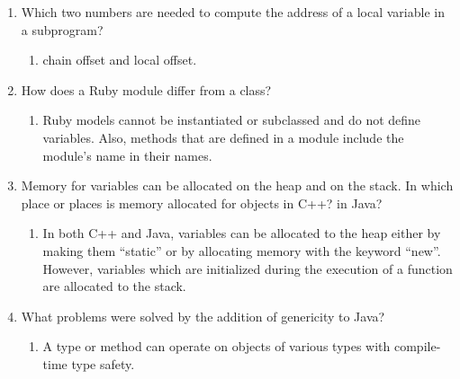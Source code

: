 \begin{enumerate}
  \item Which two numbers are needed to compute
    the address of a local variable in a subprogram?

  
    \begin{answer}

    \begin{enumerate}
    \item chain offset and local offset.
    \end{enumerate}

    \end{answer}
  \item How does a Ruby module differ from a class?

  
    \begin{answer}

    \begin{enumerate}
    \item Ruby models cannot be instantiated or subclassed and do not
      define variables.  Also, methods that are defined in a module
      include the module’s name in their names.
    \end{enumerate}

    \end{answer}

  \item Memory for variables can be allocated on the heap
    and on the stack. In which place or places is memory
    allocated for objects in C++? in Java?

  
    \begin{answer}

    \begin{enumerate}
    \item In both C++ and Java, variables can be allocated to the heap
      either by making them “static” or by allocating memory with the
      keyword “new”.  However, variables which are initialized during
      the execution of a function are allocated to the stack.
    \end{enumerate}

    \end{answer}

  \item What problems were solved by the addition
    of genericity to Java?

  
    \begin{answer}

    \begin{enumerate}
    \item A type or method can operate on objects of various types
      with compile-time type safety.
    \end{enumerate}


\end{answer}
\end{enumerate}
